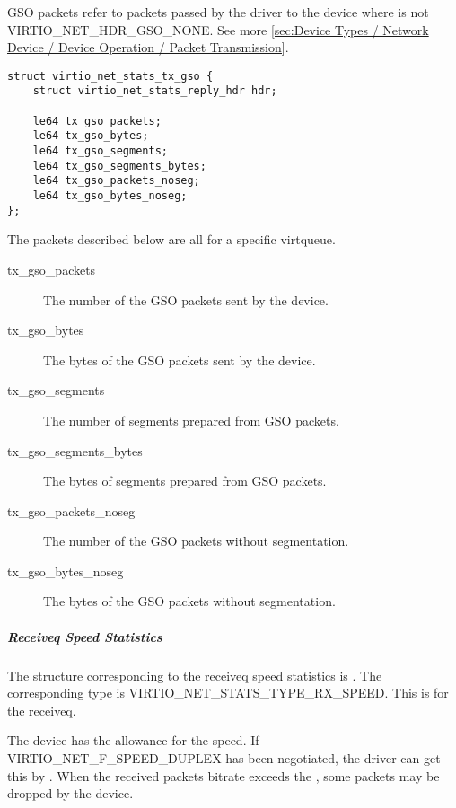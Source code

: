 GSO packets refer to packets passed by the driver to the device where
 is not VIRTIO_NET_HDR_GSO_NONE.
See more \ref{sec:Device Types / Network Device / Device Operation / Packet
Transmission}.

\begin{lstlisting}
struct virtio_net_stats_tx_gso {
    struct virtio_net_stats_reply_hdr hdr;

    le64 tx_gso_packets;
    le64 tx_gso_bytes;
    le64 tx_gso_segments;
    le64 tx_gso_segments_bytes;
    le64 tx_gso_packets_noseg;
    le64 tx_gso_bytes_noseg;
};
\end{lstlisting}

The packets described below are all for a specific virtqueue.
\begin{description}
    \item [tx_gso_packets]
        The number of the GSO packets sent by the device.

    \item [tx_gso_bytes]
        The bytes of the GSO packets sent by the device.

    \item [tx_gso_segments]
        The number of segments prepared from GSO packets.

    \item [tx_gso_segments_bytes]
        The bytes of segments prepared from GSO packets.

    \item [tx_gso_packets_noseg]
        The number of the GSO packets without segmentation.

    \item [tx_gso_bytes_noseg]
        The bytes of the GSO packets without segmentation.

\end{description}

\subparagraph{Receiveq Speed Statistics}\label{sec:Device Types / Network Device / Device Operation / Control Virtqueue / Device Statistics / Receiveq Speed Statistics}

The structure corresponding to the receiveq speed statistics is
. The corresponding type is
VIRTIO_NET_STATS_TYPE_RX_SPEED. This is for the receiveq.

The device has the allowance for the speed. If VIRTIO_NET_F_SPEED_DUPLEX has
been negotiated, the driver can get this by . When the received
packets bitrate exceeds the , some packets may be dropped by the
device.


